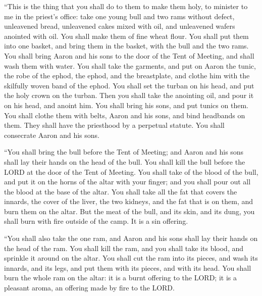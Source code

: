  ``This is the thing that you shall do to them to make them
holy, to minister to me in the priest's office: take one young bull and
two rams without defect,  unleavened bread, unleavened cakes
mixed with oil, and unleavened wafers anointed with oil. You shall make
them of fine wheat flour.  You shall put them into one
basket, and bring them in the basket, with the bull and the two rams.
 You shall bring Aaron and his sons to the door of the Tent
of Meeting, and shall wash them with water.  You shall take
the garments, and put on Aaron the tunic, the robe of the ephod, the
ephod, and the breastplate, and clothe him with the skilfully woven band
of the ephod.  You shall set the turban on his head, and put
the holy crown on the turban.  Then you shall take the
anointing oil, and pour it on his head, and anoint him.  You
shall bring his sons, and put tunics on them.  You shall
clothe them with belts, Aaron and his sons, and bind headbands on them.
They shall have the priesthood by a perpetual statute. You shall
consecrate Aaron and his sons.

 ``You shall bring the bull before the Tent of Meeting; and
Aaron and his sons shall lay their hands on the head of the bull.
 You shall kill the bull before the LORD at the door of the
Tent of Meeting.  You shall take of the blood of the bull,
and put it on the horns of the altar with your finger; and you shall
pour out all the blood at the base of the altar.  You shall
take all the fat that covers the innards, the cover of the liver, the
two kidneys, and the fat that is on them, and burn them on the altar.
 But the meat of the bull, and its skin, and its dung, you
shall burn with fire outside of the camp. It is a sin offering.

 ``You shall also take the one ram, and Aaron and his sons
shall lay their hands on the head of the ram.  You shall
kill the ram, and you shall take its blood, and sprinkle it around on
the altar.  You shall cut the ram into its pieces, and wash
its innards, and its legs, and put them with its pieces, and with its
head.  You shall burn the whole ram on the altar: it is a
burnt offering to the LORD; it is a pleasant aroma, an offering made by
fire to the LORD.


